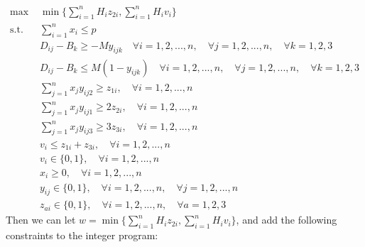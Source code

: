 \documentclass[14pt]{article}
\begin{document}
\begin{enumerate}
\begin{enumerate}
                        \begin{align*}
                              \text{max }  & \min\{\sum_{i=1}^n H_iz_{2i},\sum_{i=1}^n H_iv_{i}\}                                                                      \\
                              \text{s.t. } & \sum_{i=1}^n x_i \leq p                                                                                                   \\
                                           & D_{ij} - B_k \geq -My_{ijk} \quad \forall i = 1, 2, ..., n, \quad \forall j = 1, 2, ..., n, \quad \forall k = 1, 2, 3     \\
                                           & D_{ij} - B_k \leq M(1-y_{ijk}) \quad \forall i = 1, 2, ..., n, \quad \forall j = 1, 2, ..., n,  \quad \forall k = 1, 2, 3 \\
                                           & \sum_{j=1}^n x_jy_{ij2} \geq z_{1i}, \quad \forall i = 1, 2, ..., n                                                       \\
                                           & \sum_{j=1}^n x_jy_{ij1} \geq 2z_{2i}, \quad \forall i = 1, 2, ..., n                                                      \\
                                           & \sum_{j=1}^n x_jy_{ij3} \geq 3z_{3i}, \quad \forall i = 1, 2, ..., n                                                      \\
                                           & v_i \leq z_{1i}+z_{3i}, \quad \forall i = 1, 2, ..., n                                                                    \\
                                           & v_i \in \{0, 1\}, \quad \forall i = 1, 2, ..., n                                                                          \\
                                           & x_i \geq 0, \quad \forall i = 1, 2, ..., n                                                                                \\
                                           & y_{ij} \in \{0, 1\}, \quad \forall i = 1, 2, ..., n, \quad \forall j = 1, 2, ..., n                                       \\
                                           & z_{ai} \in \{0, 1\}, \quad \forall i = 1, 2, ..., n, \quad \forall a = 1, 2, 3
                        \end{align*}
                        Then we can let $w = \min\{\sum_{i=1}^n H_iz_{2i},\sum_{i=1}^n H_iv_{i}\}                                                 $, and add the following constraints to the integer program:

\end{enumerate}
\end{enumerate}
\end{document}
